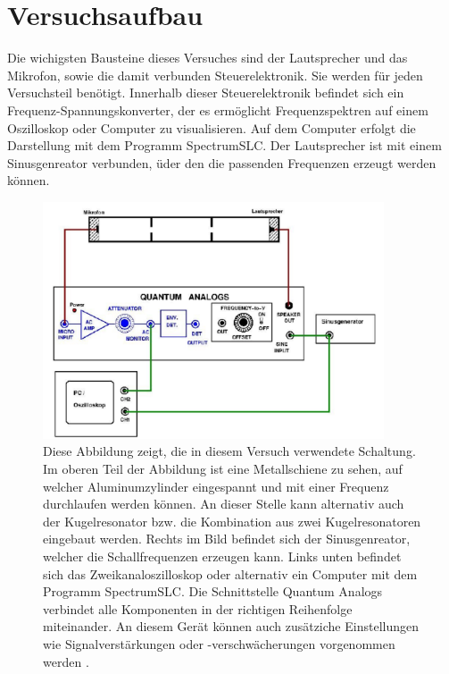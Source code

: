 \section{Versuchsaufbau}
\label{sec:Versuchsaufbau}
Die wichigsten Bausteine dieses Versuches sind der Lautsprecher und das Mikrofon, sowie 
die damit verbunden Steuerelektronik. Sie werden für jeden Versuchsteil benötigt.
Innerhalb dieser Steuerelektronik befindet sich ein Frequenz-Spannungskonverter, 
der es ermöglicht Frequenzspektren auf einem Oszilloskop oder Computer zu visualisieren.
Auf dem Computer erfolgt die Darstellung mit dem Programm SpectrumSLC.
Der Lautsprecher ist mit einem Sinusgenreator verbunden, üder den die passenden 
Frequenzen erzeugt werden können.

\begin{figure}
    \centering
    \includegraphics[width=0.9\textwidth]{figure/Schaltung.pdf}
    \caption{Diese Abbildung zeigt, die in diesem Versuch verwendete Schaltung. Im 
    oberen Teil der Abbildung ist eine Metallschiene zu sehen, auf welcher 
    Aluminumzylinder eingespannt und mit einer Frequenz durchlaufen 
    werden können. An dieser Stelle kann alternativ auch der Kugelresonator 
    bzw. die Kombination aus zwei Kugelresonatoren eingebaut werden. 
    Rechts im Bild befindet sich der Sinusgenreator, welcher die 
    Schallfrequenzen erzeugen kann. Links unten befindet sich das 
    Zweikanaloszilloskop oder alternativ ein Computer mit dem Programm
    SpectrumSLC. Die Schnittstelle Quantum Analogs verbindet alle 
    Komponenten in der richtigen Reihenfolge miteinander. An diesem 
    Gerät können auch zusätziche Einstellungen wie Signalverstärkungen 
    oder -verschwächerungen vorgenommen werden
    \cite{sample}.}
\end{figure}

